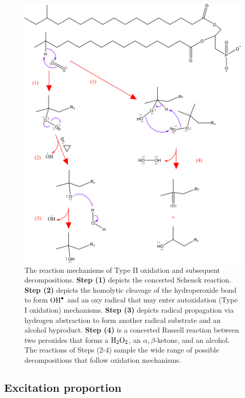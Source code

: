 \begin{figure}[t]
    \centering
    \includegraphics[width = \textwidth]{images/PDIpy/background/BCFA_schenck_oxidation_2.png}
    \caption{
         The reaction mechanisms of Type II oxidation and subsequent decompositions. \textbf{Step (1)} depicts the concerted \cite{Foote1968PhotosensitizedOxygen} Schenck reaction. \textbf{Step (2)} depicts the homolytic cleavage of the hydroperoxide bond to form $\ce{OH^.}$ and an oxy radical that may enter autoxidation (Type I oxidation) mechanisms. \textbf{Step (3)} depicts radical propagation via hydrogen abstraction to form another radical substrate and an alcohol byproduct. \textbf{Step (4)} is a concerted Russell reaction \cite{Russell1957Deuterium-isotopeRadicals,Howard1968TheMechanism} between two peroxides that forms a $\ce{H2O2}$, an $\alpha,\beta$-ketone, and an alcohol. The reactions of Steps (2-4) sample the wide range of possible decompositions that follow oxidation mechanisms.
    }
    \label{schenck_mechanism}
\end{figure}

\subsection{Excitation proportion} \label{excitation_proportion_estimate}

